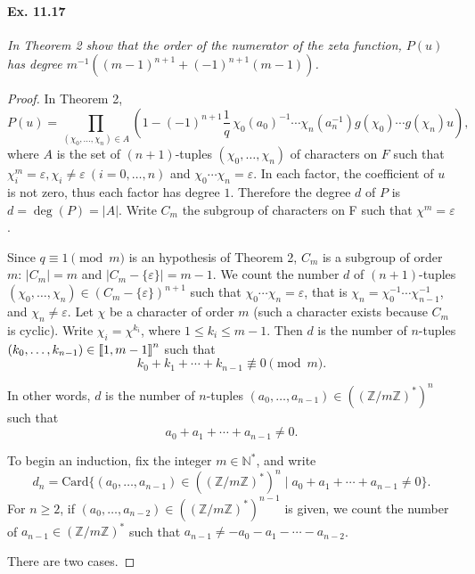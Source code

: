 \documentclass[11pt,a4paper]{article}
\def\gcro{\mbox{[\hspace{-.15em}[}}%
\def\dcro{\mbox{]\hspace{-.15em}]}}
\newcommand{\Z}{\mathbb{Z}}
\newcommand{\N}{\mathbb{N}}
\begin{document}
\paragraph{Ex. 11.17}{\it In Theorem 2 show that the order of the numerator of the zeta function, $P(u)$ has degree $m^{-1}((m-1)^{n+1} + (-1)^{n+1}(m-1))$.
}

\begin{proof}
In Theorem 2,
$$P(u) = \prod_{(\chi_0,\ldots,\chi_n) \in A } \left( 1 - (-1)^{n+1} \frac{1}{q}\, \chi_0(a_0)^{-1} \cdots \chi_n(a_n^{-1}) g(\chi_0)\cdots g(\chi_n)u \right),
$$
where $A$ is the set of $(n+ 1)$-tuples  $(\chi_0,\ldots,\chi_n)$ of characters on $F$ such that $\chi_i^m = \varepsilon, \chi_i \ne \varepsilon \ (i = 0,\ldots,n)$ and $\chi_0 \cdots \chi_n = \varepsilon$. In each factor, the coefficient of $u$ is not zero, thus each factor has degree $1$. Therefore the degree $d$ of $P$ is $d = \deg(P) = |A|$. Write $C_m$ the subgroup of characters on F such that $\chi^m = \varepsilon$. 

Since $q \equiv 1 \pmod m$ is an hypothesis of Theorem 2, $C_m$ is a subgroup of order $m$:  $|C_m| = m$ and $|C_m - \{\varepsilon\} |= m-1$. We count the number $d$ of $(n+1)$-tuples $(\chi_0,\ldots,\chi_n) \in (C_m - \{\varepsilon\})^{n+1}$ such that $\chi_0 \cdots \chi_n = \varepsilon$, that is $\chi_n = \chi_0^{-1}\cdots\chi_{n-1}^{-1}$, and $\chi_n \ne \varepsilon$. Let $\chi$ be a character of order $m$ (such a character exists because $C_m$ is cyclic). Write $\chi_i = \chi^{k_i}$, where $1 \leq k_i \leq m-1$. Then $d$ is the number of $n$-tuples $(k_0,\ldots,k_{n-1}) \in \gcro 1, m-1 \dcro^n$ such that $$k_0 + k_1 + \cdots +k_{n-1} \not \equiv 0 \pmod m.$$

In other words, $d$ is the number of $n$-tuples $(a_0,\ldots,a_{n-1}) \in ((\Z/m\Z)^*)^n$ such that $$a_0 + a_1 + \cdots +a_{n-1}\ne 0.$$

To begin an induction, fix the integer $m \in \N^*$, and write
$$d_n = \mathrm{Card} \{(a_0,\ldots,a_{n-1}) \in ((\Z/m\Z)^*)^n \mid a_0 + a_1 + \cdots +a_{n-1}\ne 0\}.$$
For $n \geq 2$, if $(a_0,\ldots,a_{n-2}) \in ((\Z/m\Z)^*)^{n-1}$ is given,  we count the number of $a_{n-1} \in (\Z/m\Z)^*$ such that  $a_{n-1} \ne -a_0-a_1 - \cdots -a_{n-2}$.

There are two cases.


\end{proof}
\end{document}
